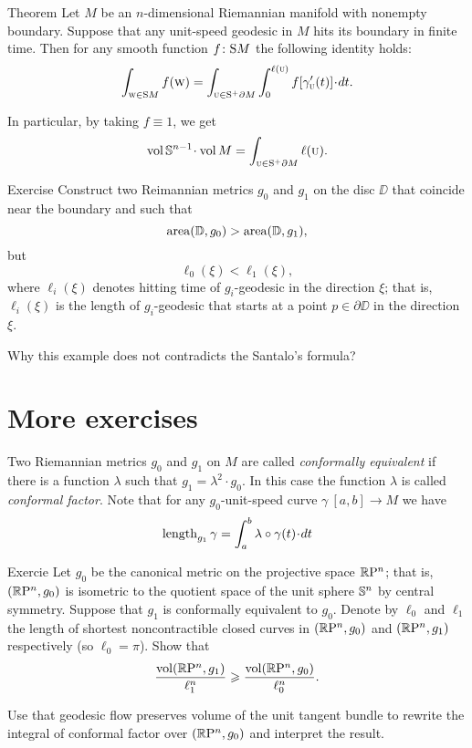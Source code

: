 \begin{thm}{Theorem}
Let $M$ be an $n$-dimensional Riemannian manifold with nonempty boundary.
Suppose that any unit-speed geodesic in $M$ hits its boundary in finite time.
Then for any smooth function $f\:\S M$ the following identity holds:
\[\int_{\vec w\in \S M}f(\vec w)
=
\int_{\vec u\in \S^+ \partial M} 
\int_0^{\ell(\vec u)} f[\gamma'_{\vec u}(t)]\cdot dt.\]

In particular, by taking $f\equiv 1$, we get
\[\vol\SSS^{n-1}\cdot\vol M=\int_{\vec u\in \S^+ \partial M} \ell(\vec u).\]

\end{thm}

\begin{thm}{Exercise}
Construct two Reimannian metrics $g_0$ and $g_1$ on the disc $\DD$ that coincide near the boundary and such that 
\[\area (\DD,g_0)>\area (\DD,g_1),\]
but 
\[\ell_0(\xi)<\ell_1(\xi),\]
where $\ell_i(\xi)$ denotes hitting time of $g_i$-geodesic in the direction $\xi$;
that is, 
$\ell_i(\xi)$ is the length of $g_i$-geodesic that starts at a point $p\in \partial \DD$ in the direction $\xi$.

Why this example does not contradicts the Santalo's formula?
\end{thm}

\section{More exercises}

Two Riemannian metrics $g_0$ and $g_1$ on $M$ are called \emph{conformally equivalent} if there is a function $\lambda$ such that $g_1=\lambda^2\cdot g_0$.
In this case the function $\lambda$ is called \emph{conformal factor}.
Note that for any $g_0$-unit-speed curve $\gamma\:[a,b]\to M$ 
we have
\[\length_{g_1}\gamma=\int_a^b\lambda\circ\gamma(t)\cdot dt\]

\begin{thm}{Exercie}
Let $g_0$ be the canonical metric on the projective space $\RP^n$; 
that is, $(\RP^n,g_0)$ is isometric to the quotient space of the unit sphere $\SSS^n$ by central symmetry.
Suppose that $g_1$ is conformally equivalent to $g_0$.
Denote by $\ell_0$ and $\ell_1$ the length of shortest noncontractible closed curves in $(\RP^n,g_0)$ and $(\RP^n,g_1)$ respectively (so $\ell_0=\pi$).
Show that 
\[\frac{\vol(\RP^n,g_1)}{\ell_1^n}\ge \frac{\vol(\RP^n,g_0)}{\ell_0^n}.\]
\end{thm}

 Use that geodesic flow preserves volume of the unit tangent bundle to rewrite the integral of conformal factor over $(\RP^n,g_0)$ and interpret the result.

